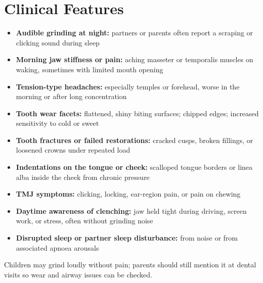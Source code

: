 \section*{Clinical Features}
\begin{itemize}
    \item \textbf{Audible grinding at night:} partners or parents often report a scraping or clicking sound during sleep
    \item \textbf{Morning jaw stiffness or pain:} aching masseter or temporalis muscles on waking, sometimes with limited mouth opening
    \item \textbf{Tension-type headaches:} especially temples or forehead, worse in the morning or after long concentration
    \item \textbf{Tooth wear facets:} flattened, shiny biting surfaces; chipped edges; increased sensitivity to cold or sweet
    \item \textbf{Tooth fractures or failed restorations:} cracked cusps, broken fillings, or loosened crowns under repeated load
    \item \textbf{Indentations on the tongue or cheek:} scalloped tongue borders or linea alba inside the cheek from chronic pressure
    \item \textbf{TMJ symptoms:} clicking, locking, ear-region pain, or pain on chewing
    \item \textbf{Daytime awareness of clenching:} jaw held tight during driving, screen work, or stress, often without grinding noise
    \item \textbf{Disrupted sleep or partner sleep disturbance:} from noise or from associated apnoea arousals
\end{itemize}

Children may grind loudly without pain; parents should still mention it at dental visits so wear and airway issues can be checked.

